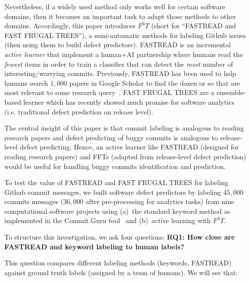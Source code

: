 \documentclass[10pt,journal,compsoc]{IEEEtran}
\begin{document}
Nevertheless, if a widely used method only works well for certain software domains,
then it becomes an important  task to  
adapt those methods to other domains. 
Accordingly, this paper introduces  
$F^3T$
(short for ``FASTREAD and FAST FRUGAL TREES''),
a semi-automatic methods for labeling   Github issues (then using them to build 
 defect predictors). FASTREAD is an incremental 
{\em active learner} that  implement a human+AI partnership where humans read the {\em fewest} items in order to train a classifier that can detect the {\em most} number of interesting/worrying commits. Previously, FASTREAD has been used to help humans search $1,000$ papers in Google Scholar to find  the dozen or so that are most relevant to some   research query~\cite{Yu:2018}.
FAST FRUGAL TREES are a ensemble-based learner which has recently showed
much promise for software analytics ~\cite{di18_fft} (i.e. traditional defect prediction on release level).


The central insight of this paper is that commit labeling  is  analogous to reading research papers and defect predicting of buggy commits is analogous to release-level defect predicting. Hence, an active learner like FASTREAD (designed for reading research papers) and FFTs (adapted from release-level defect prediction) would be useful for handling buggy commits identification and prediction.

 
To test the value of FASTREAD and FAST FRUGAL TREES
for  labeling Github commit messages,  we built software
defect predictors by labeling $45,000$ commits messages  ($36,000$ after pre-processing for analytics tasks) from nine computational software
projects  using (a)~the standard keyword method as implemented in the  Commit.Guru tool~\cite{commitguru} and (b)~active learning with $F^3T$.  

To structure this investigation, we ask four questions:
\newpage\noindent
{\bf RQ1: How close are FASTREAD and keyword labeling to human labels?}


This question compares  different labeling methods (keywords, FASTREAD)
against  ground truth labels (assigned by a team of humans).
 We will see that:
\end{document}
